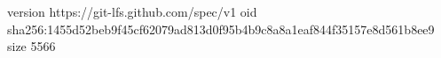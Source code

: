 version https://git-lfs.github.com/spec/v1
oid sha256:1455d52beb9f45cf62079ad813d0f95b4b9c8a8a1eaf844f35157e8d561b8ee9
size 5566
